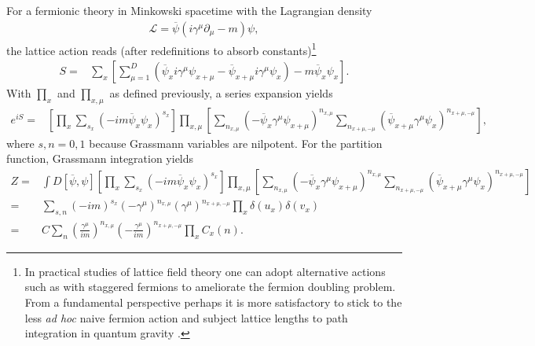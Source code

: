 \documentclass[12pt]{article}
\theoremstyle{definition}
\begin{document}
For a fermionic theory in Minkowski spacetime with the Lagrangian density 
\begin{align}
\mathcal{L}=\overline{\psi} (i \gamma^\mu \partial_\mu -m)\psi,
\end{align}
the lattice action reads (after redefinitions to absorb constants)\footnote{In practical studies of lattice field theory one can adopt alternative actions such as with staggered fermions \cite{Gattringer2018WorldlinesCycles, Marchis2018DualFluxes} to ameliorate the fermion doubling problem. From a fundamental perspective perhaps it is more satisfactory to stick to the less \textit{ad hoc} naive fermion action and subject lattice lengths to path integration in quantum gravity \cite{Hamber2009QuantumApproach}.}
\begin{align}
S=& \sum_x [ \sum_{\mu=1}^D (\overline{\psi}_x i\gamma^\mu \psi_{x+\mu} - \overline{\psi}_{x+\mu} i\gamma^\mu \psi_{x}) - m \overline{\psi}_x \psi_x].
\label{eq:fla} 
\end{align}
With $\prod_x$ and $\prod_{x,\mu}$ as defined previously, a series expansion yields
\begin{align}
e^{iS}=& [\prod_x\sum_{s_x} (-im\overline{\psi}_x \psi_x)^{s_x}]
\prod_{x,\mu} [\sum_{n_{x,\mu}}(-\overline{\psi}_x \gamma^\mu \psi_{x+\mu})^{n_{x,\mu}} \sum_{n_{x+\mu,-\mu}}(\overline{\psi}_{x+\mu} \gamma^\mu \psi_{x})^{n_{x+\mu,-\mu}}],
\end{align}
where $s, n=0,1$ because Grassmann variables are nilpotent. For the partition function, Grassmann integration yields
\begin{align}
Z=& \int D[\overline{\psi},\psi] [\prod_x\sum_{s_x} (-im\overline{\psi}_x \psi_x)^{s_x}]
\prod_{x,\mu} [\sum_{n_{x,\mu}}(-\overline{\psi}_x \gamma^\mu \psi_{x+\mu})^{n_{x,\mu}} \sum_{n_{x+\mu,-\mu}}(\overline{\psi}_{x+\mu} \gamma^\mu \psi_{x})^{n_{x+\mu,-\mu}}]
\\
=& \sum_{s, n} (-im)^{s_x}  (-\gamma^\mu)^{n_{x,\mu}} (\gamma^\mu)^{n_{x+\mu,-\mu}} \prod_x \delta(u_x) \delta(v_x)
\\
=& C \sum_{n} (\frac{\gamma^\mu}{im})^{n_{x,\mu}} (-\frac{\gamma^\mu}{im})^{n_{x+\mu,-\mu}} \prod_x C_x(n).
\end{align}
\end{document}
